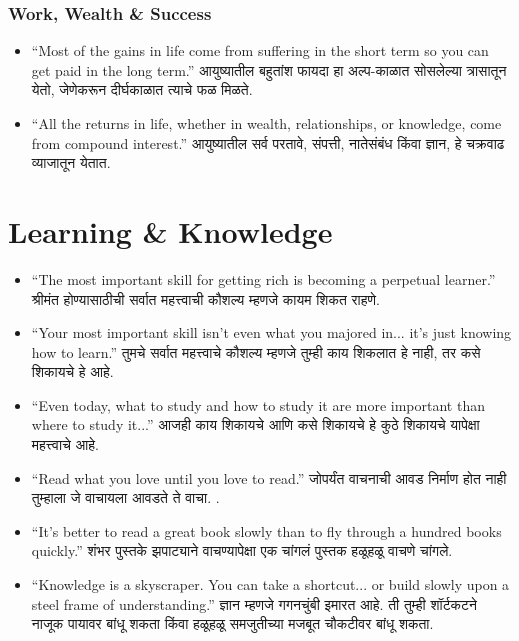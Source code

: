 \begin{frame}[fragile]\frametitle{Work, Wealth \& Success}
\begin{itemize}
    \item ``Most of the gains in life come from suffering in the short term so you can get paid in the long term.'' आयुष्यातील बहुतांश फायदा हा अल्प-काळात सोसलेल्या त्रासातून येतो, जेणेकरून दीर्घकाळात त्याचे फळ मिळते.

    \item ``All the returns in life, whether in wealth, relationships, or knowledge, come from compound interest.'' 
आयुष्यातील सर्व परतावे, संपत्ती, नातेसंबंध किंवा ज्ञान, हे चक्रवाढ व्याजातून येतात.
\end{itemize}

\section*{Learning \& Knowledge}
\begin{itemize}
    \item ``The most important skill for getting rich is becoming a perpetual learner.'' श्रीमंत होण्यासाठीची सर्वात महत्त्वाची कौशल्य म्हणजे कायम शिकत राहणे.

    \item ``Your most important skill isn’t even what you majored in... it’s just knowing how to learn.'' तुमचे सर्वात महत्त्वाचे कौशल्य म्हणजे तुम्ही काय शिकलात हे नाही, तर कसे शिकायचे हे आहे.

    \item ``Even today, what to study and how to study it are more important than where to study it...'' आजही काय शिकायचे आणि कसे शिकायचे हे कुठे शिकायचे यापेक्षा महत्त्वाचे आहे.

    \item ``Read what you love until you love to read.'' जोपर्यंत वाचनाची आवड निर्माण होत नाही तुम्हाला जे वाचायला आवडते ते वाचा. .

    \item ``It’s better to read a great book slowly than to fly through a hundred books quickly.'' शंभर पुस्तके झपाट्याने वाचण्यापेक्षा एक चांगलं पुस्तक हळूहळू वाचणे चांगले.

    \item ``Knowledge is a skyscraper. You can take a shortcut... or build slowly upon a steel frame of understanding.'' ज्ञान म्हणजे गगनचुंबी इमारत आहे. ती तुम्ही शॉर्टकटने नाजूक पायावर बांधू शकता किंवा हळूहळू समजुतीच्या मजबूत चौकटीवर बांधू शकता.
\end{itemize}
\end{frame}

